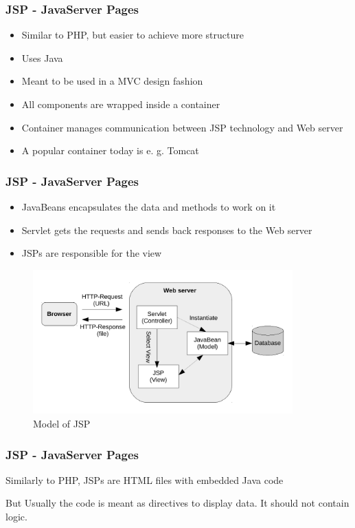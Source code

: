 \documentclass[9pt]{beamer}
\begin{document}
\begin{frame}
\frametitle<presentation>{JSP - JavaServer Pages}

  \begin{itemize}
    \item Similar to PHP, but easier to achieve more structure
    \item Uses Java
    \item Meant to be used in a MVC design fashion
    \item All components are wrapped inside a container
    \item Container manages communication between JSP technology and Web server
    \item A popular container today is e. g. Tomcat
  \end{itemize}
\end{frame}

\begin{frame}
\frametitle<presentation>{JSP - JavaServer Pages}

 \begin{itemize}
    \item JavaBeans encapsulates the data and methods to work on it
    \item Servlet gets the requests and sends back responses to the Web server
    \item JSPs are responsible for the view
  \end{itemize}
  
  \begin{figure}[h]
    \centerline{\includegraphics[width=10cm]{pics/jspMVC.pdf}}
    \caption{Model of JSP}
    \label{fig-jspMvc}
\end{figure}
\end{frame}

\begin{frame}
\frametitle<presentation>{JSP - JavaServer Pages}

  Similarly to PHP, JSPs are HTML files with embedded Java code
  
  \begin{alertblock}{But}
  Usually the code is meant as directives to display data. It should not contain logic.
  \end{alertblock}
\end{frame}
\end{document}
